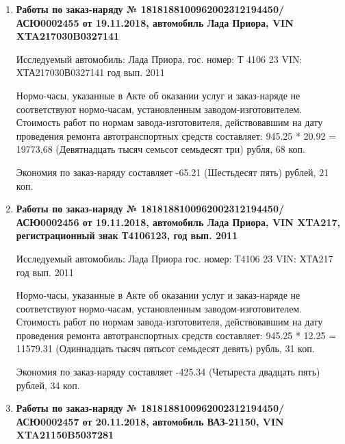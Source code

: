 \begin{enumerate}



\item \par\textbf{{Работы по заказ-наряду № 1818188100962002312194450/\-АСЮ0002455 от 19.11.2018, автомобиль Лада Приора,  VIN XTA217030B0327141}}

Исследуемый автомобиль:  Лада Приора, гос. номер: Т 4106 23 VIN: ХТА217030В0327141 год вып. 2011




Нормо-часы, указанные в Акте об оказании услуг и заказ-наряде не соответствуют нормо-часам,  установленным заводом-изготовителем.\\
Стоимость работ по нормам завода-изготовителя, действовавшим на дату проведения ремонта автотранспортных средств составляет: 945.25 * 20.92 = 19773,68 (Девятнадцать тысяч семьсот семьдесят три) рубля, 68 коп.

Экономия по заказ-наряду составляет -65.21 (Шестьдесят пять) рублей, 21 коп.  
\vspace{3mm}




\item \par\textbf{{Работы по заказ-наряду № 1818188100962002312194450/\-АСЮ0002456 от 19.11.2018, автомобиль Лада Приора,  VIN  XTA217, регистрационный знак Т4106123, год вып. 2011}}

Исследуемый автомобиль:  Лада Приора гос. номер: Т4106 23 VIN: ХТА217 год вып. 2011



Нормо-часы, указанные в Акте об оказании услуг и заказ-наряде не соответствуют нормо-часам,  установленным заводом-изготовителем.\\
Стоимость работ по нормам завода-изготовителя, действовавшим на дату проведения ремонта автотранспортных средств составляет: 945.25 * 12.25 = 11579.31 (Одиннадцать тысяч пятьсот семьдесят девять) рубль, 31 коп.

Экономия по заказ-наряду составляет -425.34 (Четыреста двадцать пять) рублей, 34 коп.  
\vspace{3mm}



\item \par\textbf{{Работы по заказ-наряду № 1818188100962002312194450/\-АСЮ0002457 от 20.11.2018, автомобиль ВАЗ-21150, VIN XTA21150B5037281
}}



\end{enumerate}
